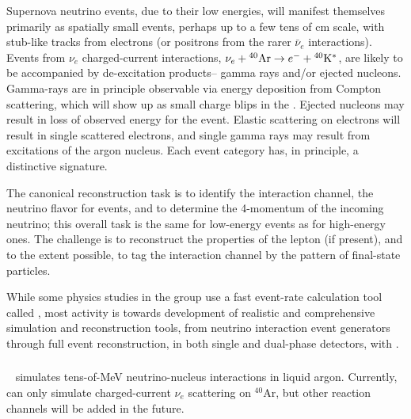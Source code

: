 Supernova neutrino events, due to their low energies, will manifest
themselves primarily as spatially small events, perhaps up to a few tens of cm
scale, with stub-like tracks from
electrons (or positrons from the rarer $\bar{\nu}_e$ interactions).
Events from $\nu_e $ charged-current interactions, $\nu_e+{}^{40}{\rm
  Ar}\rightarrow e^{-}+{}^{40}{\rm K}^{*}$, are likely to be
accompanied by de-excitation products-- gamma rays and/or ejected
nucleons. Gamma-rays are in principle observable via energy deposition
from Compton scattering, which will show up as small charge blips in
the .  
Ejected nucleons may result in loss of observed energy for
the event.  Elastic scattering on electrons will result in single
scattered electrons, and single gamma rays may result from  
excitations of the argon nucleus.   Each event category has, in principle, a
distinctive signature.

The canonical reconstruction task is to identify the interaction
channel, the neutrino flavor for  events, and to determine the
4-momentum of the incoming neutrino; this overall task is the same for
low-energy events as for high-energy ones.  The challenge is to
reconstruct the properties of the lepton (if present), and to the extent
possible, to tag the interaction channel by the pattern of final-state
particles.

While
some physics studies in the  group
 use a fast event-rate calculation tool called , most
 activity is towards development of realistic and comprehensive
 simulation and reconstruction tools, from neutrino interaction event
 generators through full event reconstruction, in both single and
 dual-phase detectors, with .


\subsubsection{}

~\cite{marley} simulates tens-of-MeV
neutrino-nucleus interactions in liquid argon. Currently,  can only
simulate charged-current $\nu_e$ scattering on $^{40}$Ar, but other
reaction channels will be added in the future.

